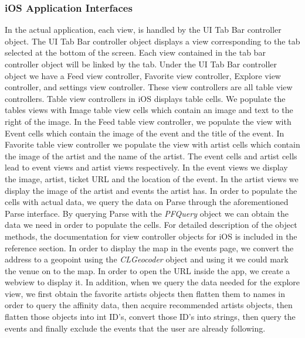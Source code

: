 	  \subsubsection{iOS Application Interfaces}
	    In the actual application, each view, is handled by the UI Tab Bar controller object. The UI Tab Bar controller object displays a view 
	    corresponding to the tab selected at the bottom of the screen. Each view contained in the tab bar controller object will be linked by the 
	    tab. Under the UI Tab Bar controller object we have a Feed view controller, Favorite view controller, Explore view controller, and settings 
	    view controller. These view controllers are all table view controllers. Table view controllers in iOS displays table cells. We populate the 
	    tables views with Image table view cells which contain an image and text to the right of the image. In the Feed table view controller, we 
	    populate the view with Event cells which contain the image of the event and the title of the event. In Favorite table view controller we 
	    populate the view with artist cells which contain the image of the artist and the name of the artist. The event cells and artist cells lead to 
	    event views and artist views respectively. In the event views we display the image, artist, ticket URL and the location of the event. In the 
	    artist views we display the image of the artist and events the artist has. In order to populate the cells with actual data, we query the data 
	    on Parse through the aforementioned Parse interface. By querying Parse with the \textit{PFQuery} object we can obtain the data we need in order 
	    to populate the cells. For detailed description of the object methods, the documentation for view controller objects for iOS is included in 
	    the reference section. In order to display the map in the events page, we convert the address to a geopoint using the \textit{CLGeocoder} object 
	    and using it we could mark the venue on to the map. In order to open the URL inside the app, we create a webview to display it. In 
	    addition, when we query the data needed for the explore view, we first obtain the favorite artists objects then flatten them to names in 
	    order to query the affinity data, then acquire recommended artists objects, then flatten those objects into int ID’s, convert those ID’s into 
	    strings, then query the events and finally exclude the events that the user are already following. 
	  	
